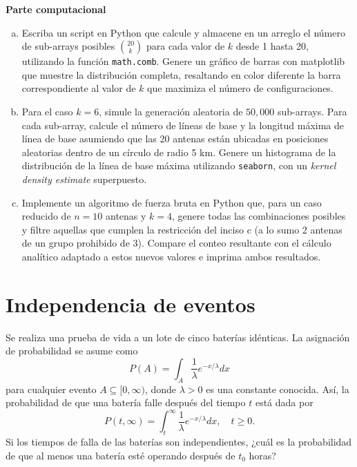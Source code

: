\documentclass[a4paper]{article}
\begin{document}
\textbf{Parte computacional}
\begin{enumerate}[a)]
\item Escriba un script en Python que calcule y almacene en un arreglo el número de sub-arrays posibles $\binom{20}{k}$ para cada valor de $k$ desde 1 hasta 20, utilizando la función \texttt{math.comb}. Genere un gráfico de barras con matplotlib que muestre la distribución completa, resaltando en color diferente la barra correspondiente al valor de $k$ que maximiza el número de configuraciones.
\item Para el caso $k = 6$, simule la generación aleatoria de $50,000$ sub-arrays. Para cada sub-array, calcule el número de líneas de base y la longitud máxima de línea de base asumiendo que las 20 antenas están ubicadas en posiciones aleatorias dentro de un círculo de radio 5 km. Genere un histograma de la distribución de la línea de base máxima utilizando \texttt{seaborn}, con un \textit{kernel density estimate} superpuesto.
\item Implemente un algoritmo de fuerza bruta en Python que, para un caso reducido de $n = 10$ antenas y $k = 4$, genere todas las combinaciones posibles y filtre aquellas que cumplen la restricción del inciso c (a lo sumo 2 antenas de un grupo prohibido de 3). Compare el conteo resultante con el cálculo analítico adaptado a estos nuevos valores e imprima ambos resultados.
\end{enumerate}

\section{Independencia de eventos}
\label{sec:problema-31}

Se realiza una prueba de vida a un lote de cinco baterías idénticas. La asignación de probabilidad se asume como
$$P(A)=\int_A \frac{1}{\lambda}e^{-x/\lambda}dx$$
para cualquier evento $A \subseteq [0,\infty)$, donde $\lambda > 0$ es una constante conocida. Así, la probabilidad de que una batería falle después del tiempo $t$ está dada por
$$P(t,\infty)=\int_t^\infty \frac{1}{\lambda}e^{-x/\lambda}dx, \quad t \ge 0.$$
Si los tiempos de falla de las baterías son independientes, ¿cuál es la probabilidad de que al menos una batería esté operando después de $t_0$ horas?



\clearpage
{}
\nocite{*}


\end{document}
